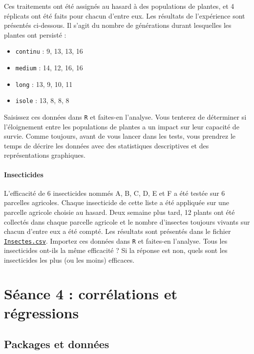\documentclass[
  a4paper,
]{article}
\providecommand{\tightlist}{%
  \setlength{\itemsep}{0pt}\setlength{\parskip}{0pt}}
\begin{document}
Ces traitements ont été assignés au hasard à des populations de plantes, et 4 réplicats ont été faits pour chacun d'entre eux. Les résultats de l'expérience sont présentés ci-dessous. Il s'agit du nombre de générations durant lesquelles les plantes ont persisté :

\begin{itemize}
\tightlist
\item
  \texttt{continu} : 9, 13, 13, 16
\item
  \texttt{medium} : 14, 12, 16, 16
\item
  \texttt{long} : 13, 9, 10, 11
\item
  \texttt{isole} : 13, 8, 8, 8
\end{itemize}

Saisissez ces données dans \texttt{R} et faites-en l'analyse. Vous tenterez de déterminer si l'éloignement entre les populations de plantes a un impact sur leur capacité de survie. Comme toujours, avant de vous lancer dans les tests, vous prendrez le temps de décrire les données avec des statistiques descriptives et des représentations graphiques.

\hypertarget{insecticides}{%
\paragraph{Insecticides}\label{insecticides}}

L'efficacité de 6 insecticides nommés A, B, C, D, E et F a été testée sur 6 parcelles agricoles. Chaque insecticide de cette liste a été appliquée sur une parcelle agricole choisie au hasard. Deux semaine plus tard, 12 plants ont été collectés dans chaque parcelle agricole et le nombre d'insectes toujours vivants sur chacun d'entre eux a été compté. Les résultats sont présentés dans le fichier \href{https://besibo.github.io/Biometrie3/data/Insectes.csv}{\texttt{Insectes.csv}}. Importez ces données dans \texttt{R} et faites-en l'analyse. Tous les insecticides ont-ils la même efficacité ? Si la réponse est non, quels sont les insecticides les plus (ou les moins) efficaces.

\hypertarget{suxe9ance-4-corruxe9lations-et-ruxe9gressions}{%
\section{Séance 4 : corrélations et régressions}\label{suxe9ance-4-corruxe9lations-et-ruxe9gressions}}

\hypertarget{packages-et-donnuxe9es-1}{%
\subsection{Packages et données}\label{packages-et-donnuxe9es-1}}
\end{document}
